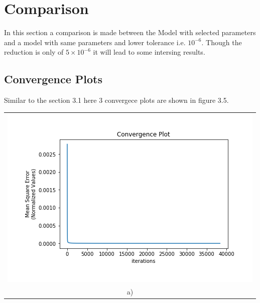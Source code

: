 \section{Comparison}
In this section a comparison is made between the Model with selected parameters and a model with same parameters and lower tolerance i.e. $10^{-6}$. Though the reduction is only of $5\times10^{-6}$ it will lead to some intersing results.
\subsection{Convergence Plots}
Similar to the section 3.1 here 3 convergece plots are shown in figure 3.5.
\begin{center}
	\begin{tabular}{c}
		\includegraphics[scale=0.65]{images/comparison/Convergence_Plot_a.png}\\
		a)\\
	\end{tabular}
	\begin{tabular}{cc}

\end{tabular}
\end{center}
